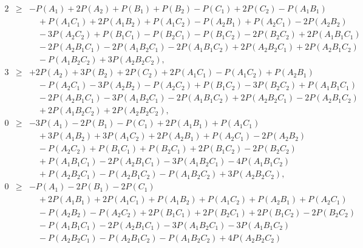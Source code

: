 \begin{eqnarray}
2&\ge& -P(A_1)+2P(A_2)+P(B_1)+P(B_2)-P(C_1)+2P(C_2)-P(A_1B_1)
\nonumber\\&&\quad
+P(A_1C_1)+2P(A_1B_2)+P(A_1C_2)-P(A_2B_1)+P(A_2C_1)-2P(A_2B_2)
\nonumber\\&&\quad
-3P(A_2C_2)+P(B_1C_1)- P(B_2C_1)- P(B_1C_2)-2P(B_2C_2)+2P(A_1B_1C_1)
\nonumber\\&&\quad
-2P(A_2B_1C_1)-2P(A_1B_2C_1)-2P(A_1B_1C_2)+2P(A_2B_2C_1)+2P(A_2B_1C_2)
\nonumber\\&&\quad
-P(A_1B_2C_2)+3P(A_2B_2C_2)
\label{eghz-5}
,\\
3&\ge& +2P(A_2)+3P(B_2)+2P(C_2)+2P(A_1C_1)-P(A_1C_2)+P(A_2B_1)
\nonumber\\&&\quad
-P(A_2C_1)-3P(A_2B_2)-P(A_2C_2)+P(B_1C_2)-3P(B_2C_2)+P(A_1B_1C_1)
\nonumber\\&&\quad
-2P(A_2B_1C_1)-3P(A_1B_2C_1)-2P(A_1B_1C_2)+2P(A_2B_2C_1)-2P(A_2B_1C_2)
\nonumber\\&&\quad
+2P(A_1B_2C_2)+2P(A_2B_2C_2)
\label{eghz-6}
,\\
 0 &\ge&  -3P(A_1) -2P(B_1) - P(C_1) +2P(A_1B_1) + P(A_1C_1)
\nonumber\\&&\quad
 +3P(A_1B_2) +3P(A_1C_2) +2P(A_2B_1) + P(A_2C_1) -2P(A_2B_2)
\nonumber\\&&\quad
- P(A_2C_2) + P(B_1C_1) + P(B_2C_1) +2P(B_1C_2) -2P(B_2C_2)
\nonumber\\&&\quad
+ P(A_1B_1C_1) -2P(A_2B_1C_1) -3P(A_1B_2C_1) -4P(A_1B_1C_2)
\nonumber\\&&\quad
+ P(A_2B_2C_1) - P(A_2B_1C_2) - P(A_1B_2C_2) +3P(A_2B_2C_2)
\label{eghz-7}
,\\
 0 &\ge& - P(A_1) - 2P(B_1) - 2P(C_1)
\nonumber\\&&\quad
+2P(A_1B_1) + 2P(A_1C_1) + P(A_1B_2) + P(A_1C_2) + P(A_2B_1) + P(A_2C_1)
\nonumber\\&&\quad
- P(A_2B_2) - P(A_2C_2) + 2P(B_1C_1) + 2P(B_2C_1) + 2P(B_1C_2) - 2P(B_2C_2)
\nonumber\\&&\quad
- P(A_1B_1C_1) - 2P(A_2B_1C_1) - 3P(A_1B_2C_1) - 3P(A_1B_1C_2)
\nonumber\\&&\quad
- P(A_2B_2C_1) - P(A_2B_1C_2) - P(A_1B_2C_2) + 4P(A_2B_2C_2)
\label{eghz-8}
\end{eqnarray}

